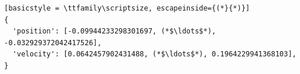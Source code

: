 \begin{lstlisting}[basicstyle = \ttfamily\scriptsize, escapeinside={(*}{*)}]
{
  'position': [-0.09944233298301697, (*$\ldots$*), -0.032929372042417526],
  'velocity': [0.0642457902431488, (*$\ldots$*), 0.1964229941368103],
}
\end{lstlisting}